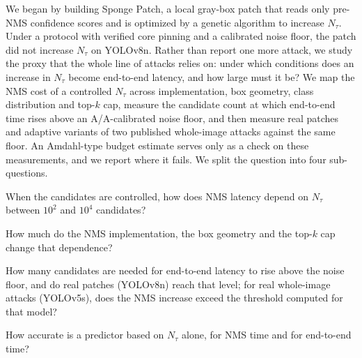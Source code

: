 \documentclass[a4paper,fleqn]{cas-dc}
\newcommand{\Ntau}{N_{\tau}}
\begin{document}
We began by building Sponge Patch, a local gray-box patch that reads only pre-NMS confidence scores and is optimized by a genetic algorithm to increase $\Ntau$. Under a protocol with verified core pinning and a calibrated noise floor, the patch did not increase $\Ntau$ on YOLOv8n. Rather than report one more attack, we study the proxy that the whole line of attacks relies on: under which conditions does an increase in $\Ntau$ become end-to-end latency, and how large must it be? We map the NMS cost of a controlled $\Ntau$ across implementation, box geometry, class distribution and top-$k$ cap, measure the candidate count at which end-to-end time rises above an A/A-calibrated noise floor, and then measure real patches and adaptive variants of two published whole-image attacks against the same floor. An Amdahl-type budget estimate serves only as a check on these measurements, and we report where it fails. We split the question into four sub-questions.
\begin{description}[leftmargin=2.5em,labelwidth=2.2em,itemsep=2pt]
\item[RQ1] When the candidates are controlled, how does NMS latency depend on $\Ntau$ between $10^2$ and $10^4$ candidates?
\item[RQ2] How much do the NMS implementation, the box geometry and the top-$k$ cap change that dependence?
\item[RQ3] How many candidates are needed for end-to-end latency to rise above the noise floor, and do real patches (YOLOv8n) reach that level; for real whole-image attacks (YOLOv5s), does the NMS increase exceed the threshold computed for that model?
\item[RQ4] How accurate is a predictor based on $\Ntau$ alone, for NMS time and for end-to-end time?
\end{description}
\end{document}
